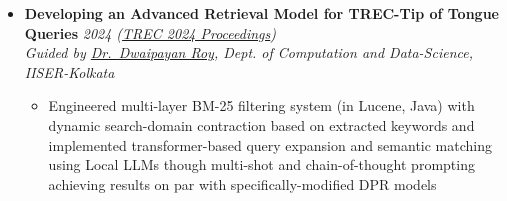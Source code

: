 \documentclass[a4paper,9pt]{article}
\newcommand{\resumeProject}[4]{
    \item\small{
        \textbf{#1} \hfill \textit{#2}\\
        \textit{#3}\\
        \begin{itemize}[leftmargin=1.5em,label=\textbullet,nosep,itemsep=0.5pt]
            #4
        \end{itemize}
    }\vspace{2pt}
}
\begin{document}
{\begin{itemize}[leftmargin=*,label={},itemsep=4pt]
     


    \resumeProject{Developing an Advanced Retrieval Model for TREC-Tip of Tongue Queries}{2024 (\href{https://trec.nist.gov/pubs/trec33/papers/IISER-K.tot.pdf}{TREC 2024 Proceedings})}
    {Guided by \href{https://dwaipayanroy.github.io/}{Dr.\ Dwaipayan Roy}, Dept. of Computation and Data-Science, IISER-Kolkata}
    {\item Engineered multi-layer BM-25 filtering system (in Lucene, Java) with dynamic search-domain contraction based on extracted keywords and implemented transformer-based query expansion and semantic matching using Local LLMs though multi-shot and chain-of-thought prompting achieving results on par with specifically-modified DPR models}
     
\end{itemize}
}
\end{document}
